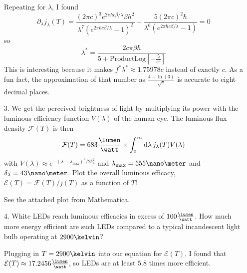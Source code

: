 \documentclass[a4paper,twoside]{article}
\begin{document}
\begin{itemize}
\begin{problem}
            Repeating for $ \lambda $, I found
            \begin{equation}
                \partial_{\lambda} j_{\lambda}(T) = \frac{(2 \pi c)^3 e^{2 \pi \hbar c \beta / \lambda} \beta h^2}{\lambda^7 \left( e^{2 \pi \hbar c \beta / \lambda} - 1 \right)^2} - \frac{5(2 \pi c)^2 \hbar}{\lambda^6 (e^{2 \pi \hbar c \beta / \lambda} - 1)} = 0
            \end{equation}
            so
            \begin{equation}
                \lambda^* = \frac{2c \pi \beta \hbar}{5 + \text{ProductLog} \left[ - \frac{5}{e^5} \right]}
            \end{equation}
            This is interesting because it makes $ f^* \lambda^* \approx 1.75978 c $ instead of exactly $ c $. As a fun fact, the approximation of that number as $ \frac{4 - \ln(3)}{\sqrt{e}} $ is accurate to eight decimal places.
        \end{problem}
    \item[3.] We get the perceived brightness of light by multiplying its power with the luminous efficiency function $ V(\lambda) $ of the human eye. The luminous flux density $ \mathcal{F}(T) $ is then
        \begin{equation}
            \mathcal{F}(T) = 683 \frac{\lumen}{\watt} \times \int_0^{\infty} \dd{\lambda} j_{\lambda}(T) V(\lambda)
        \end{equation}
        with $ V(\lambda) \approx e^{- (\lambda - \lambda_{\text{max}})^2 / 2 \delta^2_{\lambda}} $ and $ \lambda_{\text{max}} = 555\nano\meter $ and $ \delta_{\lambda} = 43\nano\meter $. Plot the overall luminous efficacy, $ \mathcal{E}(T) = \mathcal{F}(T) / j(T) $ as a function of $ T $!
        \begin{problem}
            See the attached plot from Mathematica.
        \end{problem}
    \item[4.] White LEDs reach luminous efficacies in excess of $ 100 \frac{\lumen}{\watt} $. How much more energy efficient are such LEDs compared to a typical incandescent light bulb operating at $ 2900\kelvin $?
        \begin{problem}
            Plugging in $ T = 2900\kelvin $ into our equation for $ \mathcal{E}(T) $, I found that $ \mathcal{E}(T) \approx 17.2456\frac{\lumen}{\watt} $, so LEDs are at least $ 5.8 $ times more efficient.
        \end{problem}
\end{itemize}
\end{document}
